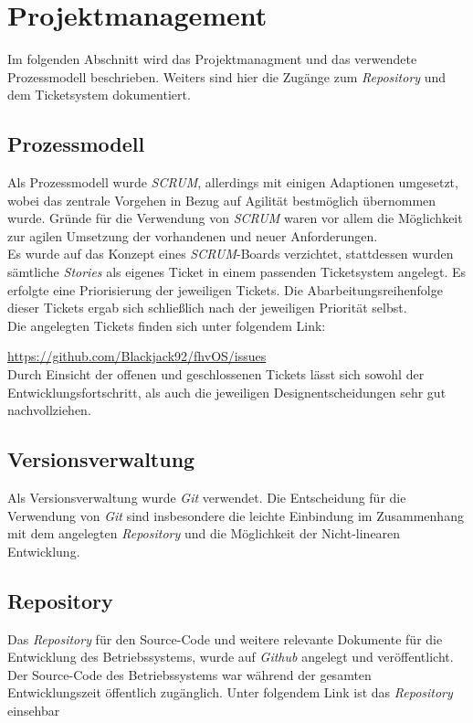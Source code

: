 \section{Projektmanagement}
Im folgenden Abschnitt wird das Projektmanagment und das verwendete Prozessmodell beschrieben. Weiters sind hier die Zugänge zum \textit{Repository} und dem Ticketsystem dokumentiert.

\subsection{Prozessmodell}
Als Prozessmodell wurde \textit{SCRUM}, allerdings mit einigen Adaptionen umgesetzt, wobei das zentrale Vorgehen in Bezug auf Agilität bestmöglich übernommen wurde. Gründe für die Verwendung von \textit{SCRUM} waren vor allem die Möglichkeit zur agilen Umsetzung der vorhandenen und neuer Anforderungen.\\
Es wurde auf das Konzept eines \textit{SCRUM}-Boards verzichtet, stattdessen wurden sämtliche \textit{Stories} als eigenes Ticket in einem passenden Ticketsystem angelegt. Es erfolgte eine Priorisierung der jeweiligen Tickets. Die Abarbeitungsreihenfolge dieser Tickets ergab sich schließlich nach der jeweiligen Priorität selbst.\\

Die angelegten Tickets finden sich unter folgendem Link:

\url{https://github.com/Blackjack92/fhvOS/issues} \\

Durch Einsicht der offenen und geschlossenen Tickets lässt sich sowohl der Entwicklungsfortschritt, als auch die jeweiligen Designentscheidungen sehr gut nachvollziehen.

\subsection{Versionsverwaltung}
Als Versionsverwaltung wurde \textit{Git} verwendet. Die Entscheidung für die Verwendung von \textit{Git} sind insbesondere die leichte Einbindung im Zusammenhang mit dem angelegten \textit{Repository} und die Möglichkeit der Nicht-linearen Entwicklung.

\subsection{Repository}
\label{Repository}
Das \textit{Repository} für den Source-Code und weitere relevante Dokumente für die Entwicklung des Betriebssystems, wurde auf \textit{Github} angelegt und veröffentlicht. Der Source-Code des Betriebssystems war während der gesamten Entwicklungszeit öffentlich zugänglich. Unter folgendem Link ist das \textit{Repository} einsehbar\\

